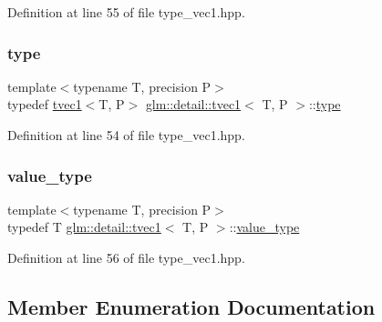 Definition at line 55 of file type\+\_\+vec1.\+hpp.

\mbox{\label{structglm_1_1detail_1_1tvec1_aaf46d49a966e6d66f8f9c6beb5a33afe}} 
\subsubsection{\texorpdfstring{type}{type}}
{\footnotesize\ttfamily template$<$typename T, precision P$>$ \\
typedef \hyperlink{structglm_1_1detail_1_1tvec1}{tvec1}$<$T, P$>$ \hyperlink{structglm_1_1detail_1_1tvec1}{glm\+::detail\+::tvec1}$<$ T, P $>$\+::\hyperlink{structglm_1_1detail_1_1tvec1_aaf46d49a966e6d66f8f9c6beb5a33afe}{type}}



Definition at line 54 of file type\+\_\+vec1.\+hpp.

\mbox{\label{structglm_1_1detail_1_1tvec1_ac69856e6aa1e97517e1edabc836a9c1a}} 
\subsubsection{\texorpdfstring{value\+\_\+type}{value\_type}}
{\footnotesize\ttfamily template$<$typename T, precision P$>$ \\
typedef T \hyperlink{structglm_1_1detail_1_1tvec1}{glm\+::detail\+::tvec1}$<$ T, P $>$\+::\hyperlink{structglm_1_1detail_1_1tvec1_ac69856e6aa1e97517e1edabc836a9c1a}{value\+\_\+type}}



Definition at line 56 of file type\+\_\+vec1.\+hpp.



\subsection{Member Enumeration Documentation}
\mbox{\label{structglm_1_1detail_1_1tvec1_a33f1783ca537d8dad5624e5adcf6bd5a}} 
